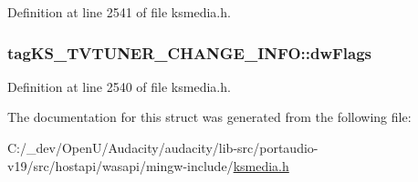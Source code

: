 Definition at line 2541 of file ksmedia.\+h.

\subsubsection[{\texorpdfstring{dw\+Flags}{dwFlags}}]{ tag\+K\+S\+\_\+\+T\+V\+T\+U\+N\+E\+R\+\_\+\+C\+H\+A\+N\+G\+E\+\_\+\+I\+N\+F\+O\+::dw\+Flags}\hypertarget{structtag_k_s___t_v_t_u_n_e_r___c_h_a_n_g_e___i_n_f_o_ac4a60d39fb1809d143d7f30021c4ee67}{}\label{structtag_k_s___t_v_t_u_n_e_r___c_h_a_n_g_e___i_n_f_o_ac4a60d39fb1809d143d7f30021c4ee67}


Definition at line 2540 of file ksmedia.\+h.



The documentation for this struct was generated from the following file\+:\begin{DoxyCompactItemize}
\item 
C\+:/\+\_\+dev/\+Open\+U/\+Audacity/audacity/lib-\/src/portaudio-\/v19/src/hostapi/wasapi/mingw-\/include/\hyperlink{ksmedia_8h}{ksmedia.\+h}\end{DoxyCompactItemize}
